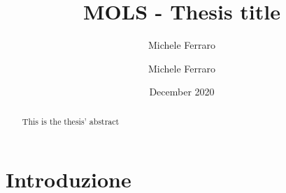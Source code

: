 \documentclass[LaM,english]{sapthesis}
\author{Michele Ferraro}
\date{December 2020}
\title{MOLS - Thesis title}
\author{Michele Ferraro}
\begin{document}
\frontmatter
\maketitle

\dedication{Dedicated to XYZ}

\begin{abstract}
This is the thesis' abstract
\end{abstract}

\mainmatter

\tableofcontents

\chapter{Introduzione}
\end{document}
